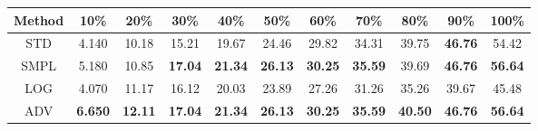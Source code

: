 \documentclass{standalone}
\begin{document}
\begin{tabular}{c|cccccccccc}
      \toprule
      Method & 10\% & 20\% & 30\% & 40\% & 50\% & 60\% & 70\% & 80\% & 90\% & 100\% \\
      \midrule
STD & 4.140 & 10.18 & 15.21 & 19.67 & 24.46 & 29.82 & 34.31 & 39.75 & \textbf{46.76} & 54.42\\
SMPL & 5.180 & 10.85 & \textbf{17.04} & \textbf{21.34} & \textbf{26.13} & \textbf{30.25} & \textbf{35.59} & 39.69 & \textbf{46.76} & \textbf{56.64}\\
LOG & 4.070 & 11.17 & 16.12 & 20.03 & 23.89 & 27.26 & 31.26 & 35.26 & 39.67 & 45.48\\
ADV & \textbf{6.650} & \textbf{12.11} & \textbf{17.04} & \textbf{21.34} & \textbf{26.13} & \textbf{30.25} & \textbf{35.59} & \textbf{40.50} & \textbf{46.76} & \textbf{56.64}\\
  \bottomrule
\end{tabular}
\end{document}
